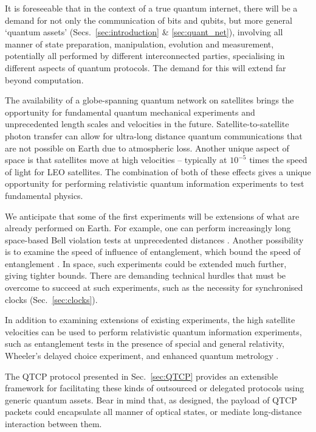 It is foreseeable that in the context of a true quantum internet, there will be a demand for not only the communication of bits and qubits, but more general `quantum assets' (Secs.~\ref{sec:introduction} \& \ref{sec:quant_net}), involving all manner of state preparation, manipulation, evolution and measurement, potentially all performed by different interconnected parties, specialising in different aspects of quantum protocols. The demand for this will extend far beyond computation.

The availability of a globe-spanning quantum network on satellites brings the opportunity for fundamental quantum mechanical experiments and unprecedented length scales and velocities in the future. Satellite-to-satellite photon transfer can allow for ultra-long distance quantum communications that are not possible on Earth due to atmospheric loss. Another unique aspect of space is that satellites move at high velocities -- typically at $10^{-5} $ times the speed of light for LEO satellites. The combination of both of these effects gives a unique opportunity for performing relativistic quantum information experiments to test fundamental physics. 

We anticipate that some of the first experiments will be extensions of what are already performed on Earth. For example, one can perform increasingly long space-based Bell violation tests at unprecedented distances \cite{bib:yin2017satellite}. Another possibility is to examine the speed of influence of entanglement, which bound the speed of entanglement \cite{bib:yin2013lower}. In space, such experiments could be extended much further, giving tighter bounds. There are demanding technical hurdles that must be overcome to succeed at such experiments, such as the necessity for synchronised clocks (Sec.~\ref{sec:clocks}).

 In addition to examining extensions of existing experiments, the high satellite velocities can be used to perform relativistic quantum information experiments, such as entanglement tests in the presence of special and general relativity, Wheeler's delayed choice experiment, and enhanced quantum metrology \cite{sec:kaltenbaek2003proof, sec:scheidl2013quantum, sec:ahmadi2014relativistic}.

The QTCP protocol presented in Sec.~\ref{sec:QTCP} provides an extensible framework for facilitating these kinds of outsourced or delegated protocols using generic quantum assets. Bear in mind that, as designed, the payload of QTCP packets could encapsulate all manner of optical states, or mediate long-distance interaction between them.

